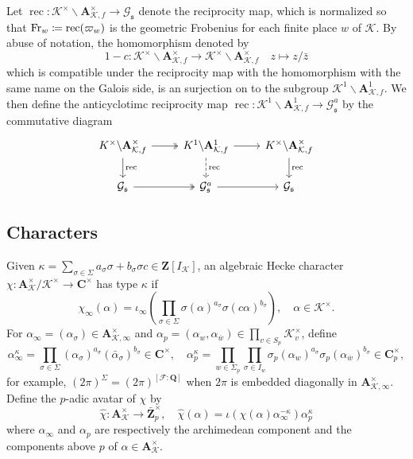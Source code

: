 \documentclass[leqno]{amsart}
\theoremstyle{definition}
\theoremstyle{remark}
\newcommand{\Q}{{\mathbf{Q}}}
\newcommand{\Z}{{\mathbf{Z}}}
\newcommand{\C}{\mathbf C}
\newcommand{\A}{\mathbf A}
\DeclareMathOperator{\rec}{rec}
\newcommand{\Fr}{\textnormal{Fr}} %
\newcommand{\fs}{\mathfrak{s}}
\newcommand{\F}{{\mathcal{F}}} %
\newcommand{\K}{{\mathcal{K}}} %
\newcommand{\bw}{\overline{w}}
\newcommand{\cG}{\mathcal{G}}
\begin{document}
Let $\rec\colon \K^\times\backslash\A_{\K,f}^\times \to \cG_{\fs}$
denote the reciprocity map,
which is normalized so that $\Fr_w\coloneqq \rec(\varpi_w)$
is the geometric Frobenius for each finite place $w$ of $\K$.
By abuse of notation, the homomorphism denoted by
\[
1-c\colon \K^\times\backslash\A_{\K,f}^\times\to
\K^\times\backslash\A_{\K,f}^\times\quad
z\mapsto z/\bar{z}
\]
which is compatible under the reciprocity map
with the homomorphism with the same name on the Galois side,
is an surjection on to the subgroup
$\K^1\backslash \A_{\K,f}^1$.
We then define the anticyclotimc
reciprocity map $\rec\colon \K^1\backslash\A_{\K,f}^1\to \cG_{\fs}^a$
by the commutative diagram
\begin{equation}\label{eq:anticyc_rec}
\begin{tikzcd}
    K^\times\backslash\A_{\K,f}^\times
    \arrow[r,twoheadrightarrow]\arrow[d,"\rec"]&
    K^1\backslash\A_{\K,f}^1 \arrow[r]\arrow[d,"\rec",dashed]&
    K^\times\backslash\A_{\K,f}^\times\arrow[d,"\rec"]\\
    \cG_{\fs} \arrow[r,twoheadrightarrow]&
    \cG_{\fs}^a\arrow[r]&
    \cG_{\fs}
\end{tikzcd}
\end{equation}


\subsection{Characters}
Given 
$\kappa=\sum_{\sigma\in \Sigma} a_\sigma\sigma+b_\sigma\sigma c\in \Z[I_\K]$,
an algebraic Hecke character 
$\chi\colon \A_\K^\times/\K^\times\to \C^\times$ 
has type $\kappa$ if
\[
    \chi_\infty(\alpha)=
    \iota_\infty \left(\prod_{\sigma\in \Sigma} 
    \sigma(\alpha)^{a_\sigma}\sigma(c \alpha)^{b_\sigma}\right),\quad
    \alpha\in \K^\times.
\]
For $\alpha_\infty=(\alpha_\sigma)\in \A_{\K,\infty}^\times$
and $\alpha_p=(\alpha_w,\alpha_{\bw})\in \prod_{v\in S_p}\K_v^\times$, 
define
\[
    \alpha_\infty^\kappa=
    \prod_{\sigma\in \Sigma} 
    (\alpha_\sigma)^{a_\sigma}(\bar{\alpha}_\sigma)^{b_\sigma}\in \C^\times,\quad
    \alpha_p^\kappa=
    \prod_{w\in \Sigma_p}
    \prod_{\sigma\in I_w}
    \sigma_p(\alpha_w)^{a_\sigma}\sigma_p(\alpha_{\bw})^{b_\sigma}\in \C_p^\times,
\]
for example,
$(2\pi)^\Sigma=(2\pi)^{[\F:\Q]}$
when $2\pi$ is embedded diagonally in $\A_{\K,\infty}^\times$.
Define the $p$-adic avatar of $\chi$ by
\[
    \hat{\chi}\colon \A_\K^\times\to \bar{\Z}_p^\times,\quad
    \hat{\chi}(\alpha)=\iota(\chi(\alpha)\alpha_\infty^{-\kappa})\alpha_p^{\kappa}
\]
where $\alpha_\infty$ and $\alpha_p$ are respectively 
the archimedean component and the components above $p$ of $\alpha\in \A_\K^\times$.
\end{document}
